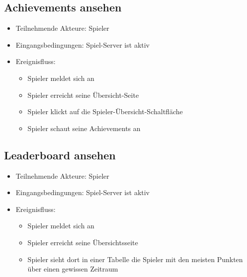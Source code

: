 \documentclass[a4paper]{scrreprt}
\begin{document}
	    \subsection{Achievements ansehen}
    \begin{itemize}
        \item Teilnehmende Akteure: \Gls{Spieler}
        \item Eingangsbedingungen: Spiel-Server ist aktiv
        \item Ereignisfluss:
        \begin{itemize}
            \item \Gls{Spieler} meldet sich an
            \item \Gls{Spieler} erreicht seine Übersicht-Seite
            \item \Gls{Spieler} klickt auf die Spieler-Übersicht-Schaltfläche
            \item \Gls{Spieler} schaut seine Achievements an
        \end{itemize}
    \end{itemize}
    \subsection{Leaderboard ansehen}
    \begin{itemize}
        \item Teilnehmende Akteure: \Gls{Spieler}
        \item Eingangsbedingungen: Spiel-Server ist aktiv
        \item Ereignisfluss:
        \begin{itemize}
            \item \Gls{Spieler} meldet sich an
            \item \Gls{Spieler} erreicht seine Übersichtsseite
            \item \Gls{Spieler} sieht dort in einer Tabelle die \Gls{Spieler} mit den meisten Punkten über einen gewissen Zeitraum
        \end{itemize}
    \end{itemize}
    \newpage
\end{document}
